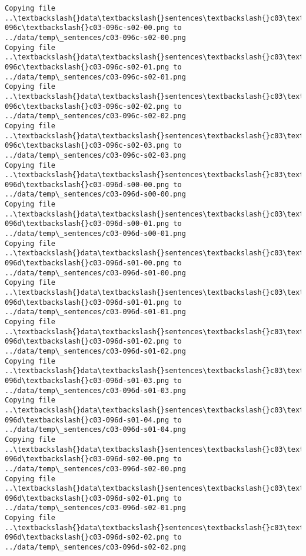 \documentclass[11pt]{article}
\begin{document}
\begin{Verbatim}[commandchars=\\\{\}]
Copying file ..\textbackslash{}data\textbackslash{}sentences\textbackslash{}c03\textbackslash{}c03-096c\textbackslash{}c03-096c-s02-00.png to
../data/temp\_sentences/c03-096c-s02-00.png
Copying file ..\textbackslash{}data\textbackslash{}sentences\textbackslash{}c03\textbackslash{}c03-096c\textbackslash{}c03-096c-s02-01.png to
../data/temp\_sentences/c03-096c-s02-01.png
Copying file ..\textbackslash{}data\textbackslash{}sentences\textbackslash{}c03\textbackslash{}c03-096c\textbackslash{}c03-096c-s02-02.png to
../data/temp\_sentences/c03-096c-s02-02.png
Copying file ..\textbackslash{}data\textbackslash{}sentences\textbackslash{}c03\textbackslash{}c03-096c\textbackslash{}c03-096c-s02-03.png to
../data/temp\_sentences/c03-096c-s02-03.png
Copying file ..\textbackslash{}data\textbackslash{}sentences\textbackslash{}c03\textbackslash{}c03-096d\textbackslash{}c03-096d-s00-00.png to
../data/temp\_sentences/c03-096d-s00-00.png
Copying file ..\textbackslash{}data\textbackslash{}sentences\textbackslash{}c03\textbackslash{}c03-096d\textbackslash{}c03-096d-s00-01.png to
../data/temp\_sentences/c03-096d-s00-01.png
Copying file ..\textbackslash{}data\textbackslash{}sentences\textbackslash{}c03\textbackslash{}c03-096d\textbackslash{}c03-096d-s01-00.png to
../data/temp\_sentences/c03-096d-s01-00.png
Copying file ..\textbackslash{}data\textbackslash{}sentences\textbackslash{}c03\textbackslash{}c03-096d\textbackslash{}c03-096d-s01-01.png to
../data/temp\_sentences/c03-096d-s01-01.png
Copying file ..\textbackslash{}data\textbackslash{}sentences\textbackslash{}c03\textbackslash{}c03-096d\textbackslash{}c03-096d-s01-02.png to
../data/temp\_sentences/c03-096d-s01-02.png
Copying file ..\textbackslash{}data\textbackslash{}sentences\textbackslash{}c03\textbackslash{}c03-096d\textbackslash{}c03-096d-s01-03.png to
../data/temp\_sentences/c03-096d-s01-03.png
Copying file ..\textbackslash{}data\textbackslash{}sentences\textbackslash{}c03\textbackslash{}c03-096d\textbackslash{}c03-096d-s01-04.png to
../data/temp\_sentences/c03-096d-s01-04.png
Copying file ..\textbackslash{}data\textbackslash{}sentences\textbackslash{}c03\textbackslash{}c03-096d\textbackslash{}c03-096d-s02-00.png to
../data/temp\_sentences/c03-096d-s02-00.png
Copying file ..\textbackslash{}data\textbackslash{}sentences\textbackslash{}c03\textbackslash{}c03-096d\textbackslash{}c03-096d-s02-01.png to
../data/temp\_sentences/c03-096d-s02-01.png
Copying file ..\textbackslash{}data\textbackslash{}sentences\textbackslash{}c03\textbackslash{}c03-096d\textbackslash{}c03-096d-s02-02.png to
../data/temp\_sentences/c03-096d-s02-02.png

\end{Verbatim}
\end{document}
